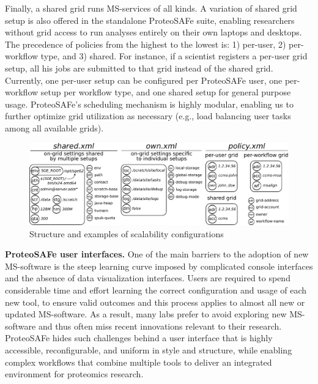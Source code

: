 \documentclass[arial,11pt]{article}
\newcommand{\SF}[1]{\textsf{#1}}
\newcommand{\SYSTEM}[0]{\SF{ProteoSAFe}\xspace}
\begin{document}
Finally, a \SF{shared} grid runs MS-services of all kinds. A variation of \SF{shared} grid setup is also offered in the standalone \SYSTEM suite, enabling researchers without grid access to run analyses entirely on their own laptops and desktops. The precedence of policies from the highest to the lowest is: 1) per-user, 2) per-workflow type, and 3) shared. For instance, if a scientist registers a per-user grid setup, all his jobs are submitted to that grid instead of the shared grid. Currently, one per-user setup can be configured per \SYSTEM user, one per-workflow setup per workflow type, and one shared setup for general purpose usage. \SYSTEM's scheduling mechanism is highly modular, enabling us to further optimize grid utilization as necessary (e.g., load balancing user tasks among all available grids).

\begin{figure}[ht]
  \centering
  \includegraphics[width=\textwidth]{figures/scal.pdf}
  \caption{\footnotesize Structure and examples of scalability configurations}
  \label{fig:scal}
\end{figure}


{\bf ProteoSAFe user interfaces.} One of the main barriers to the adoption of new MS-software is the steep learning curve imposed by complicated console interfaces and the absence of data visualization interfaces.  Users are required to spend considerable time and effort learning the correct configuration and usage of each new tool, to ensure valid outcomes and this process applies to almost all new or updated MS-software.  As a result, many labs prefer to avoid exploring new MS-software and thus often miss recent innovations relevant to their research. \SYSTEM hides such challenges behind a user interface that is highly accessible, reconfigurable, and uniform in style and structure, while enabling complex workflows that combine multiple tools to deliver an integrated environment for proteomics research.
\end{document}
